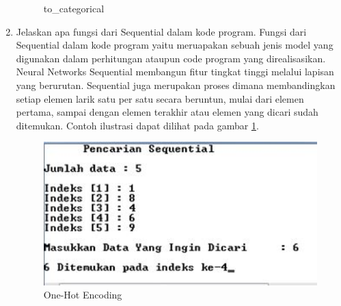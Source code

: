 \begin{enumerate}
\begin{figure}[!htbp]
	\caption{to\_categorical}
\end{figure} 
\item Jelaskan apa fungsi dari Sequential dalam kode program.
\subitem Fungsi dari Sequential dalam kode program yaitu meruapakan sebuah jenis model yang digunakan dalam perhitungan ataupun code program yang direalisasikan. Neural Networks Sequential membangun fitur tingkat tinggi melalui lapisan yang berurutan. Sequential juga merupakan proses dimana membandingkan setiap elemen larik satu per satu secara beruntun, mulai dari elemen pertama, sampai dengan elemen terakhir atau elemen yang dicari sudah ditemukan.  Contoh ilustrasi dapat dilihat pada gambar \ref{c6_8}.
\begin{figure}[!htbp]
	\centerline{\includegraphics[width=1\textwidth]{figures/huda/chapter6/8.JPG}}
	\caption{One-Hot Encoding}
	\label{c6_8}
\end{figure} 
\end{enumerate}

